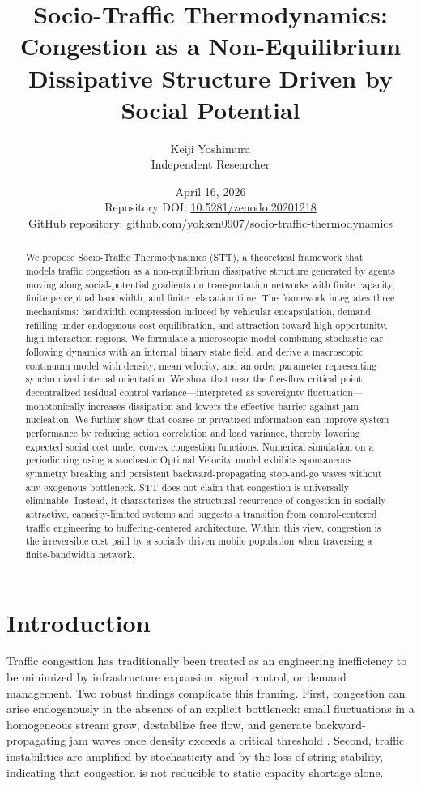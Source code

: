 \documentclass[11pt]{article}
\title{\vspace{-1.5em}\textbf{Socio-Traffic Thermodynamics:}\\[0.25em]
\large Congestion as a Non-Equilibrium Dissipative Structure Driven by Social Potential}
\author{Keiji Yoshimura \\ \small Independent Researcher}
\date{April 16, 2026\\[0.35em]
\small Repository DOI: \href{https://doi.org/10.5281/zenodo.20201218}{10.5281/zenodo.20201218}\\
\small GitHub repository: \href{https://github.com/yokken0907/socio-traffic-thermodynamics}{github.com/yokken0907/socio-traffic-thermodynamics}}
\begin{document}
\maketitle

\begin{abstract}
We propose Socio-Traffic Thermodynamics (STT), a theoretical framework that models traffic congestion as a non-equilibrium dissipative structure generated by agents moving along social-potential gradients on transportation networks with finite capacity, finite perceptual bandwidth, and finite relaxation time. The framework integrates three mechanisms: bandwidth compression induced by vehicular encapsulation, demand refilling under endogenous cost equilibration, and attraction toward high-opportunity, high-interaction regions. We formulate a microscopic model combining stochastic car-following dynamics with an internal binary state field, and derive a macroscopic continuum model with density, mean velocity, and an order parameter representing synchronized internal orientation. We show that near the free-flow critical point, decentralized residual control variance---interpreted as sovereignty fluctuation---monotonically increases dissipation and lowers the effective barrier against jam nucleation. We further show that coarse or privatized information can improve system performance by reducing action correlation and load variance, thereby lowering expected social cost under convex congestion functions. Numerical simulation on a periodic ring using a stochastic Optimal Velocity model exhibits spontaneous symmetry breaking and persistent backward-propagating stop-and-go waves without any exogenous bottleneck. STT does not claim that congestion is universally eliminable. Instead, it characterizes the structural recurrence of congestion in socially attractive, capacity-limited systems and suggests a transition from control-centered traffic engineering to buffering-centered architecture. Within this view, congestion is the irreversible cost paid by a socially driven mobile population when traversing a finite-bandwidth network.
\end{abstract}

\section{Introduction}
Traffic congestion has traditionally been treated as an engineering inefficiency to be minimized by infrastructure expansion, signal control, or demand management. Two robust findings complicate this framing. First, congestion can arise endogenously in the absence of an explicit bottleneck: small fluctuations in a homogeneous stream grow, destabilize free flow, and generate backward-propagating jam waves once density exceeds a critical threshold \cite{Bando1995, Sugiyama2008, Helbing2001}. Second, traffic instabilities are amplified by stochasticity and by the loss of string stability, indicating that congestion is not reducible to static capacity shortage alone.
\end{document}
